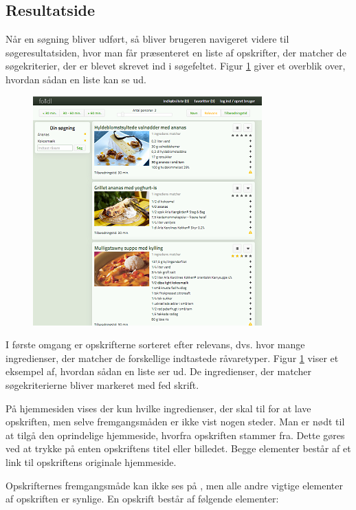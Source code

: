 \subsection{Resultatside}
\label{subsec:brug-resultat}

Når en søgning bliver udført, så bliver brugeren navigeret videre til søgeresultatsiden, hvor man får præsenteret en liste af opskrifter, der matcher de søgekriterier, der er blevet skrevet ind i søgefeltet. Figur \ref{fig:overblik-resultat} giver et overblik over, hvordan sådan en liste kan se ud.

\begin{figure}[ht]
	\centering
	\includegraphics[scale=1]{billeder/foodl/thumbnails/soegeresultat.png}
	\label{fig:overblik-resultat}
\end{figure}

I første omgang er opskrifterne sorteret efter relevans, dvs. hvor mange ingredienser, der matcher de forskellige indtastede råvaretyper. Figur \ref{fig:overblik-resultat} viser et eksempel af, hvordan sådan en liste ser ud. De ingredienser, der matcher søgekriterierne bliver markeret med fed skrift. 

På hjemmesiden vises der kun hvilke ingredienser, der skal til for at lave opskriften, men selve fremgangsmåden er ikke vist nogen steder. Man er nødt til at tilgå den oprindelige hjemmeside, hvorfra opskriften stammer fra. Dette gøres ved at trykke på enten opskriftens titel eller billedet. Begge elementer består af et link til opskriftens originale hjemmeside. 

Opskrifternes fremgangsmåde kan ikke ses på \Foodl{}, men alle andre vigtige elementer af opskriften er synlige. En opskrift består af følgende elementer:


